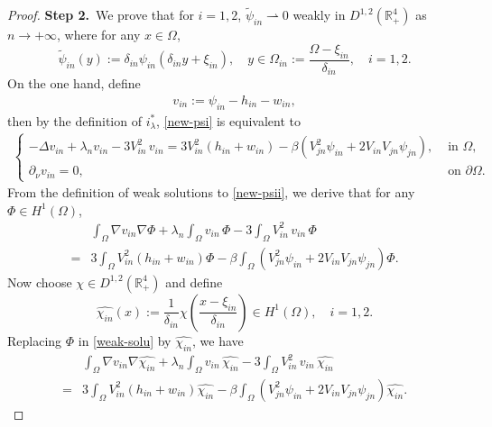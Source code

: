\documentclass[10pt,a4paper]{amsart}
\newcommand{\R}{\mathbb{R}}
\begin{document}
\begin{proof}
{\textbf{Step 2.}~We prove that  for $i=1,2$, \( \widetilde{\psi}_{in}\rightharpoonup 0 \) weakly in \(D^{1,2}(\R^4_{+})\) as $n \rightarrow+\infty$, where for any $x\in\Omega$,
$$
    \label{trans}\widetilde{\psi}_{in}(y):=\delta_{in}\psi_{in}\left(\delta_{in} y+\xi_{in}\right),\quad y\in\Omega_{in}:=\frac{\Omega-\xi_{in}}{\delta_{in}},\quad i=1,2.
$$ }
On the one hand, define \begin{align}
    \label{def-vn}v_{in}:=\psi_{in}-h_{in}-w_{in},
\end{align} then by the definition of $i^*_{\lambda}$, \eqref{new-psi} is equivalent to
\begin{align}\label{new-psii}
    \begin{cases}
-\Delta v_{in}+\lambda_n  v_{in}- 3V_{in}^2\,v_{in}=3V_{in}^2( h_{in}+w_{in})-\beta\left(V_{jn}^2\psi_{in}+2V_{in}V_{jn}\psi_{jn}\right), &\text{ in $\Omega$},\\
\partial_{\nu}v_{in}=0,&\text{ on $\partial\Omega$.}
\end{cases}
\end{align}
From the definition of weak solutions to \eqref{new-psii}, we derive that for any $\Phi\in H^{1}(\Omega)$, 
\begin{align}
    \label{weak-solu}
    &\displaystyle\int_{\Omega}\nabla v_{in}\nabla\Phi+\lambda_n\displaystyle\int_{\Omega}v_{in}\,\Phi -3\displaystyle\int_{\Omega}V_{in}^2\,v_{in}\,\Phi\nonumber\\=&3\displaystyle\int_{\Omega}V_{in}^2( h_{in}+w_{in})\Phi-\beta\displaystyle\int_{\Omega}\left(V_{jn}^2\psi_{in}+2V_{in}V_{jn}\psi_{jn}\right)\Phi.
\end{align}
Now  choose $\chi\in D^{1,2}(\R^4_+)$ and define $$\widehat{\chi_{in}}(x):=\frac{1}{\delta_{in}}\chi\left(\frac{x-\xi_{in}}{\delta_{in}}\right)\in H^{1}(\Omega),\quad i=1,2.$$
Replacing $\Phi$ in \eqref{weak-solu} by $\widehat{\chi_{in}}$, we have
\begin{align}
    \label{weak-solu-22}
   &\displaystyle\int_{\Omega}\nabla v_{in}\nabla\widehat{\chi_{in}}+\lambda_n\displaystyle\int_{\Omega}v_{in}\,\widehat{\chi_{in}} -3\displaystyle\int_{\Omega}V_{in}^2\,v_{in}\,\widehat{\chi_{in}}\nonumber\\=&3\displaystyle\int_{\Omega}V_{in}^2( h_{in}+w_{in})\widehat{\chi_{in}}-\beta\displaystyle\int_{\Omega}\left(V_{jn}^2\psi_{in}+2V_{in}V_{jn}\psi_{jn}\right)\widehat{\chi_{in}}.
\end{align}


\end{proof}
\end{document}

